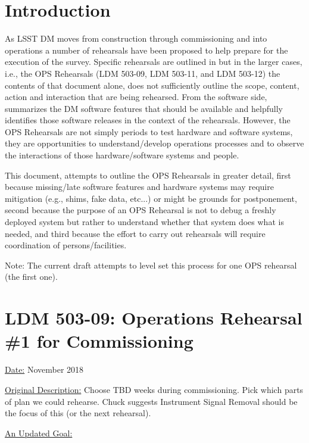 
\section{Introduction}

As LSST DM moves from construction through commissioning and into operations 
a number of rehearsals have been proposed to help prepare for the execution 
of the survey.  Specific rehearsals are outlined in  but in 
the larger cases, i.e., the OPS Rehearsals (LDM 503-09, LDM 503-11, and 
LDM 503-12) the contents of that document alone, does not sufficiently outline 
the scope, content, action and interaction that are being rehearsed.  
From the software side, 
summarizes the DM software features that should be available and helpfully 
identifies those software releases in the context of the rehearsals.  
However, the OPS Rehearsals are not simply periods to test hardware and 
software systems, they are opportunities to understand/develop operations 
processes and to observe the interactions of those hardware/software systems 
and people. 

This document, attempts to outline the OPS Rehearsals in greater detail, 
first because missing/late software features and hardware systems may 
require mitigation (e.g., shims, fake data, etc...) or might be grounds for 
postponement, second because the purpose of an OPS Rehearsal is not to debug 
a freshly deployed system but rather to understand whether that system does
what is needed, and third because the effort to carry out rehearsals will 
require coordination of persons/facilities. 

Note: The current draft attempts to level set this process for one OPS 
rehearsal (the first one).


\section{LDM 503-09: Operations Rehearsal \#1 for Commissioning}

\underline{Date:} November 2018

\underline{Original Description:}
Choose TBD weeks during commissioning. Pick which parts of plan we could 
rehearse.  Chuck suggests Instrument Signal Removal should be the focus 
of this (or the next rehearsal).

\clearpage

\underline{An Updated Goal:}

